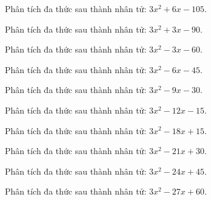 \begin{bt}
	Phân tích đa thức sau thành nhân tử: $3 x^2 + 6 x - 105$.
\end{bt}
\begin{bt}
	Phân tích đa thức sau thành nhân tử: $3 x^2 + 3 x - 90$.
\end{bt}
\begin{bt}
	Phân tích đa thức sau thành nhân tử: $3 x^2 - 3 x - 60$.
\end{bt}
\begin{bt}
	Phân tích đa thức sau thành nhân tử: $3 x^2 - 6 x - 45$.
\end{bt}
\begin{bt}
	Phân tích đa thức sau thành nhân tử: $3 x^2 - 9 x - 30$.
\end{bt}
\begin{bt}
	Phân tích đa thức sau thành nhân tử: $3 x^2 - 12 x - 15$.
\end{bt}
\begin{bt}
	Phân tích đa thức sau thành nhân tử: $3 x^2 - 18 x + 15$.
\end{bt}
\begin{bt}
	Phân tích đa thức sau thành nhân tử: $3 x^2 - 21 x + 30$.
\end{bt}
\begin{bt}
	Phân tích đa thức sau thành nhân tử: $3 x^2 - 24 x + 45$.
\end{bt}
\begin{bt}
	Phân tích đa thức sau thành nhân tử: $3 x^2 - 27 x + 60$.
\end{bt}

